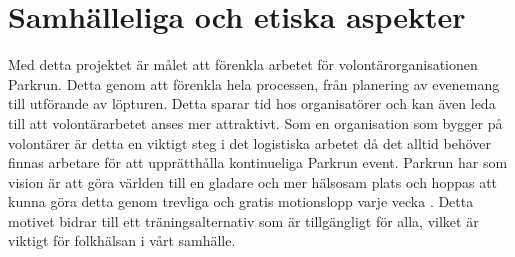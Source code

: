 \section{Samhälleliga och etiska aspekter}

Med detta projektet är målet att förenkla arbetet för volontärorganisationen Parkrun. Detta genom att förenkla hela processen, från planering av evenemang till utförande av löpturen. Detta sparar tid hos organisatörer och kan även leda till att volontärarbetet anses mer attraktivt. Som en organisation som bygger på volontärer är detta en viktigt steg i det logistiska arbetet då det alltid behöver finnas arbetare för att upprätthålla kontinueliga Parkrun event. Parkrun har som vision är att göra världen till en gladare och mer hälsosam plats och hoppas att kunna göra detta genom trevliga och gratis motionslopp varje vecka \cite{omOss}. Detta motivet bidrar till ett träningsalternativ som är tillgängligt för alla, vilket är viktigt för folkhälsan i vårt samhälle.